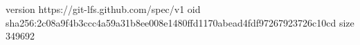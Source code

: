 version https://git-lfs.github.com/spec/v1
oid sha256:2c08a9f4b3ccc4a59a31b8ee008e1480ffd1170abead4fdf97267923726c10cd
size 349692
